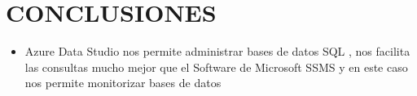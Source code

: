\section{CONCLUSIONES} 

\begin{itemize}
	\item Azure Data Studio nos permite administrar bases de datos SQL , nos facilita las consultas mucho mejor que el Software de Microsoft SSMS y en este caso nos permite monitorizar bases de datos
	
	

\end{itemize}